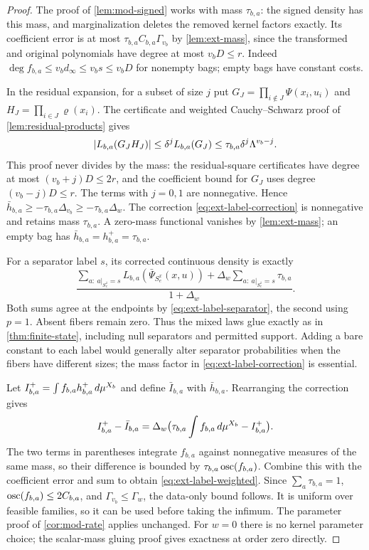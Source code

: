 \begin{proof}
The proof of \cref{lem:mod-signed} works with mass $\tau_{b,a}$: the
signed density has this mass, and marginalization deletes the removed
kernel factors exactly. Its coefficient error is at most
$\tau_{b,a}C_{b,a}\Gamma_{v_b}$ by \cref{lem:ext-mass}, since the
transformed and original polynomials have degree at most $v_bD\le r$.
Indeed $\deg f_{b,a}\le v_bd_\infty\le v_bs\le v_bD$ for nonempty bags;
empty bags have constant costs.

In the residual expansion, for a subset of size $j$ put
$G_J=\prod_{i\notin J}\Psi(x_i,u_i)$ and
$H_J=\prod_{i\in J}\varrho(x_i)$. The certificate and weighted
Cauchy--Schwarz proof of \cref{lem:residual-products} gives
\[
 \lvert L_{b,a}(G_JH_J)\rvert\le\delta^jL_{b,a}(G_J)
 \le\tau_{b,a}\delta^j\Lambda^{v_b-j}.
\]
This proof never divides by the mass: the residual-square certificates
have degree at most $(v_b+j)D\le2r$, and the coefficient bound for $G_J$
uses degree $(v_b-j)D\le r$. The terms with $j=0,1$ are nonnegative.
Hence $\bar h_{b,a}\ge-\tau_{b,a}\Delta_{v_b}\ge-\tau_{b,a}\Delta_w$.
The correction \eqref{eq:ext-label-correction} is nonnegative and retains
mass $\tau_{b,a}$. A zero-mass functional vanishes by
\cref{lem:ext-mass}; an empty bag has $\bar h_{b,a}=h^+_{b,a}=\tau_{b,a}$.

For a separator label $s$, its corrected continuous density is exactly
\[
 \frac{\displaystyle
 \sum_{a:\ a|_{S_e^z}=s}L_{b,a}(\bar\Psi_{S_e^x}(x,u))
 +\Delta_w\sum_{a:\ a|_{S_e^z}=s}\tau_{b,a}}{1+\Delta_w}.
\]
Both sums agree at the endpoints by \eqref{eq:ext-label-separator}, the
second using $p=1$. Absent fibers remain zero. Thus the mixed laws glue
exactly as in \cref{thm:finite-state}, including null separators and
permitted support. Adding a bare constant to each label would generally
alter separator probabilities when the fibers have different sizes; the
mass factor in \eqref{eq:ext-label-correction} is essential.

Let $I^+_{b,a}=\int f_{b,a}h^+_{b,a}\,d\mu^{X_b}$ and define
$\bar I_{b,a}$ with $\bar h_{b,a}$. Rearranging the correction gives
\[
 I^+_{b,a}-\bar I_{b,a}
 =\Delta_w\bigl(\tau_{b,a}\int f_{b,a}\,d\mu^{X_b}-I^+_{b,a}\bigr).
\]
The two terms in parentheses integrate $f_{b,a}$ against nonnegative
measures of the same mass, so their difference is bounded by
$\tau_{b,a}\operatorname{osc}(f_{b,a})$. Combine this with the coefficient error and
sum to obtain \eqref{eq:ext-label-weighted}. Since
$\sum_a\tau_{b,a}=1$, $\operatorname{osc}(f_{b,a})\le2C_{b,a}$, and
$\Gamma_{v_b}\le\Gamma_w$, the data-only bound follows. It is uniform
over feasible families, so it can be used before taking the infimum.
The parameter proof of \cref{cor:mod-rate} applies unchanged. For $w=0$
there is no kernel parameter choice; the scalar-mass gluing proof gives
exactness at order zero directly.
\end{proof}

